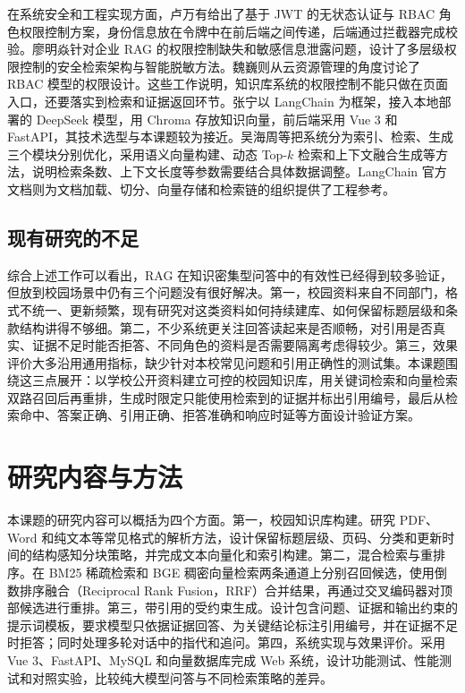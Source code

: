 在系统安全和工程实现方面，卢万有给出了基于 JWT 的无状态认证与 RBAC 角色权限控制方案，身份信息放在令牌中在前后端之间传递，后端通过拦截器完成校验。廖明焱针对企业 RAG 的权限控制缺失和敏感信息泄露问题，设计了多层级权限控制的安全检索架构与智能脱敏方法。魏巍则从云资源管理的角度讨论了 RBAC 模型的权限设计。这些工作说明，知识库系统的权限控制不能只做在页面入口，还要落实到检索和证据返回环节。张宁以 LangChain 为框架，接入本地部署的 DeepSeek 模型，用 Chroma 存放知识向量，前后端采用 Vue 3 和 FastAPI，其技术选型与本课题较为接近。吴海周等把系统分为索引、检索、生成三个模块分别优化，采用语义向量构建、动态 Top-$k$ 检索和上下文融合生成等方法，说明检索条数、上下文长度等参数需要结合具体数据调整。LangChain 官方文档则为文档加载、切分、向量存储和检索链的组织提供了工程参考。

\subsection{现有研究的不足}

综合上述工作可以看出，RAG 在知识密集型问答中的有效性已经得到较多验证，但放到校园场景中仍有三个问题没有很好解决。第一，校园资料来自不同部门，格式不统一、更新频繁，现有研究对这类资料如何持续建库、如何保留标题层级和条款结构讲得不够细。第二，不少系统更关注回答读起来是否顺畅，对引用是否真实、证据不足时能否拒答、不同角色的资料是否需要隔离考虑得较少。第三，效果评价大多沿用通用指标，缺少针对本校常见问题和引用正确性的测试集。本课题围绕这三点展开：以学校公开资料建立可控的校园知识库，用关键词检索和向量检索双路召回后再重排，生成时限定只能使用检索到的证据并标出引用编号，最后从检索命中、答案正确、引用正确、拒答准确和响应时延等方面设计验证方案。

\section{研究内容与方法}
\label{sec:content}

本课题的研究内容可以概括为四个方面。第一，校园知识库构建。研究 PDF、Word 和纯文本等常见格式的解析方法，设计保留标题层级、页码、分类和更新时间的结构感知分块策略，并完成文本向量化和索引构建。第二，混合检索与重排序。在 BM25 稀疏检索和 BGE 稠密向量检索两条通道上分别召回候选，使用倒数排序融合（Reciprocal Rank Fusion，RRF）合并结果，再通过交叉编码器对顶部候选进行重排。第三，带引用的受约束生成。设计包含问题、证据和输出约束的提示词模板，要求模型只依据证据回答、为关键结论标注引用编号，并在证据不足时拒答；同时处理多轮对话中的指代和追问。第四，系统实现与效果评价。采用 Vue 3、FastAPI、MySQL 和向量数据库完成 Web 系统，设计功能测试、性能测试和对照实验，比较纯大模型问答与不同检索策略的差异。

